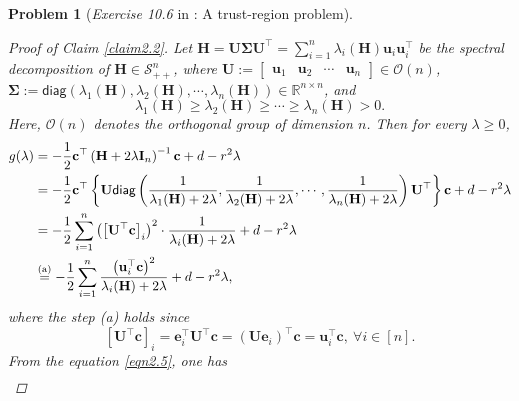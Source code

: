 \documentclass[11pt]{article}
\newtheorem{problem}{Problem}
\numberwithin{equation}{problem}
\begin{document}
\begin{problem} [\emph{Exercise 10.6} in \cite{calafiore2014optimization}: A trust-region problem]
{\begin{proof} [Proof of Claim \ref{claim2.2}]
Let $\mathbf{H} = \mathbf{U \Sigma U}^{\top} = \sum_{i=1}^{n} \lambda_i (\mathbf{H}) \mathbf{u}_i \mathbf{u}_{i}^{\top}$ be the spectral decomposition of $\mathbf{H} \in \mathcal{S}_{++}^n$, where $\mathbf{U} := \begin{bmatrix} \mathbf{u}_1 & \mathbf{u}_2 & \cdots & \mathbf{u}_n \end{bmatrix} \in \mathcal{O}(n)$, $\mathbf{\Sigma} := \textsf{diag} \left( \lambda_1 (\mathbf{H}), \lambda_2 (\mathbf{H}), \cdots, \lambda_n (\mathbf{H}) \right) \in \mathbb{R}^{n \times n}$, and
\begin{equation*}
    \lambda_1 (\mathbf{H}) \geq \lambda_2 (\mathbf{H}) \geq \cdots \geq \lambda_n (\mathbf{H}) > 0.
\end{equation*}
Here, $\mathcal{O}(n)$ denotes the orthogonal group of dimension $n$. Then for every $\lambda \geq 0$,
\begin{equation}
    \label{eqn2.5}
    \begin{split}
        g(\lambda) &= - \frac{1}{2} \mathbf{c}^{\top} \left( \mathbf{H} + 2 \lambda \mathbf{I}_n \right)^{-1} \mathbf{c} + d - r^2 \lambda \\
        &= - \frac{1}{2} \mathbf{c}^{\top} \left\{ \mathbf{U} \textsf{diag} \left( \frac{1}{\lambda_1 (\mathbf{H}) + 2 \lambda}, \frac{1}{\lambda_2 (\mathbf{H}) + 2 \lambda}, \cdots, \frac{1}{\lambda_n (\mathbf{H}) + 2 \lambda} \right) \mathbf{U}^{\top} \right\} \mathbf{c} + d - r^2 \lambda \\
        &= - \frac{1}{2} \sum_{i=1}^{n} \left( \left[ \mathbf{U}^{\top} \mathbf{c} \right]_i \right)^2 \cdot \frac{1}{\lambda_i (\mathbf{H}) + 2 \lambda} + d - r^2 \lambda \\
        &\stackrel{\textnormal{(a)}}{=} - \frac{1}{2} \sum_{i=1}^{n} \frac{\left( \mathbf{u}_{i}^{\top} \mathbf{c} \right)^2}{\lambda_i (\mathbf{H}) + 2 \lambda} + d - r^2 \lambda,
    \end{split}
\end{equation}
where the step (a) holds since
\begin{equation*}
    \left[ \mathbf{U}^{\top} \mathbf{c} \right]_i = \mathbf{e}_{i}^{\top} \mathbf{U}^{\top} \mathbf{c}
    = \left( \mathbf{U e}_i \right)^{\top} \mathbf{c} = \mathbf{u}_{i}^{\top} \mathbf{c},\ \forall i \in [n].
\end{equation*}
From the equation \eqref{eqn2.5}, one has
\begin{equation}
    \label{eqn2.6}
    \begin{split}

\end{split}
\end{equation}
\end{proof}}
\end{problem}
\end{document}
